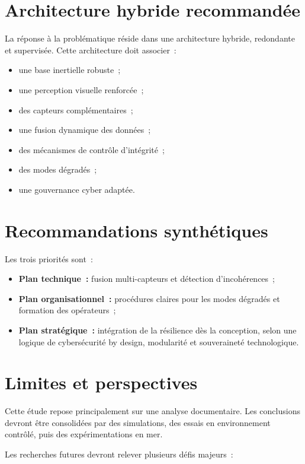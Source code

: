 \documentclass[12pt, a4paper, twoside, openright]{report}
\begin{document}
\section{Architecture hybride recommandée}

La réponse à la problématique réside dans une architecture hybride, redondante et supervisée. Cette architecture doit associer~:

\begin{itemize}
    \item une base inertielle robuste~;
    \item une perception visuelle renforcée~;
    \item des capteurs complémentaires~;
    \item une fusion dynamique des données~;
    \item des mécanismes de contrôle d'intégrité~;
    \item des modes dégradés~;
    \item une gouvernance cyber adaptée.
\end{itemize}

\section{Recommandations synthétiques}

Les trois priorités sont~:

\begin{itemize}
    \item \textbf{Plan technique~:} fusion multi-capteurs et détection d'incohérences~;
    \item \textbf{Plan organisationnel~:} procédures claires pour les modes dégradés et formation des opérateurs~;
    \item \textbf{Plan stratégique~:} intégration de la résilience dès la conception, selon une logique de cybersécurité by design, modularité et souveraineté technologique.
\end{itemize}

\section{Limites et perspectives}

Cette étude repose principalement sur une analyse documentaire. Les conclusions devront être consolidées par des simulations, des essais en environnement contrôlé, puis des expérimentations en mer.

Les recherches futures devront relever plusieurs défis majeurs~:
\end{document}
